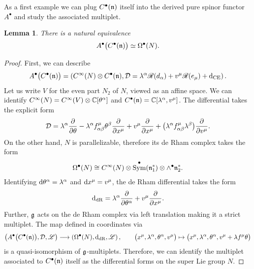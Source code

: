 \documentclass[pdftex]{sigma}
\numberwithin{equation}{section}
\newtheorem{lem}[thm]{Lemma}
\def\d{{\rm d}}
\DeclareMathOperator{\Sym}{Sym}
\def\sL{\mathscr L}
\def\sR{\mathscr R}
\begin{document}
As a first example we can plug $C^\bullet(\mathfrak n)$ itself into the derived pure spinor functor $A^\bullet$ and study the associated multiplet.

\begin{lem}
	There is a natural equivalence
	\begin{equation*}
	A^\bullet\big(C^\bullet(\mathfrak n)\big) \simeq \Omega^\bullet(N).
	\end{equation*}
	
\end{lem}

\begin{proof}
	First, we can describe
	\begin{equation*}
	A^\bullet\big(C^\bullet(\fn)\big) = \left( C^\infty(N) \otimes C^\bullet(\fn) , \cD = \lambda^\alpha \sR(d_\alpha) + v^\mu \sR(e_\mu) + \d_{\mathrm{CE}} \right) .
	\end{equation*}
	Let us write $V$ for the even part $N_2$ of $N$, viewed as an affine space. We can identify $C^\infty(N) = C^\infty(V) \otimes \mathbb C[\theta^\alpha]$ and $C^\bullet(\mathfrak n) = \mathbb C[\lambda^\alpha , v^\mu]$. The differential takes the explicit form
	\begin{equation*}
	\mathcal D = \lambda^\alpha \frac{\partial}{\partial \theta} - \lambda^\alpha f^\mu_{\alpha \beta} \theta^\beta \frac{\partial}{\partial x^\mu} + v^\mu \frac{\partial}{\partial x^\mu} + \big(\lambda^\alpha f^\mu_{\alpha \beta} \lambda^\beta\big) \frac{\partial}{\partial v^\mu} .
	\end{equation*}
	On the other hand, $N$ is parallelizable, therefore its de Rham complex takes the form
	\begin{equation*}
	\Omega^\bullet(N) \cong C^\infty(N) \otimes \Sym^\bullet(\fn_1^*) \otimes \wedge^\bullet\fn_2^* .
	\end{equation*}
	Identifying $\d\theta^\alpha = \lambda^\alpha$ and $\d x^\mu = v^\mu$, the de Rham differential takes the form
	\begin{equation*}
	\d_{\mathrm{dR}} = \lambda^\alpha \frac{\partial}{\partial \theta^\alpha} + v^\mu \frac{\partial}{\partial x^\mu} .
	\end{equation*}
	Further, $\mathfrak g$ acts on the de Rham complex via left translation making it a strict multiplet. The map defined in coordinates via
	\begin{equation*}
	\big( A^\bullet\big(C^\bullet(\fn)\big) , \cD , \sL \big) \longrightarrow \left( \Omega^\bullet(N) , \d_{\mathrm{dR}} , \sL \right), \qquad \big(x^\mu, \lambda^\alpha, \theta^\alpha , v^\mu\big) \mapsto \big(x^\mu, \lambda^\alpha, \theta^\alpha, v^\mu + \lambda f^\mu \theta\big)
	\end{equation*}
	is a quasi-isomorphism of $\mathfrak g$-multiplets. Therefore, we can identify the multiplet associated to $C^\bullet(\mathfrak n)$ itself as the differential forms on the super Lie group $N$.
\end{proof}
\end{document}
